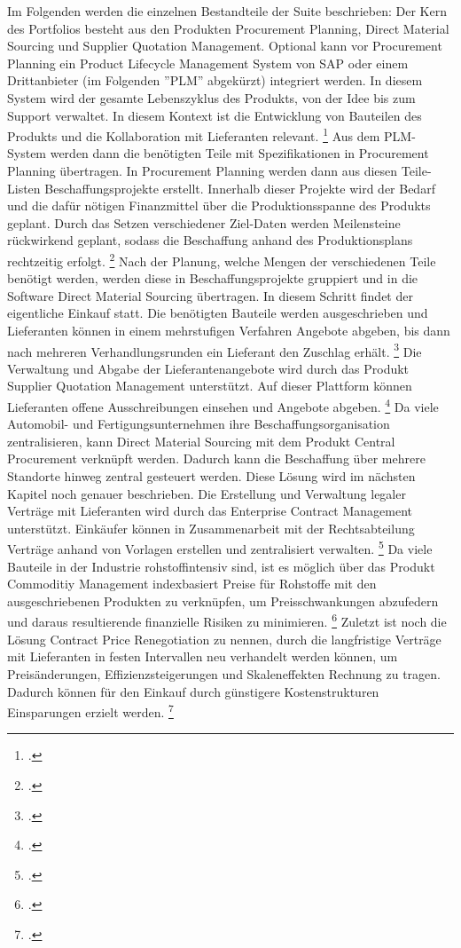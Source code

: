 Im Folgenden werden die einzelnen Bestandteile der Suite beschrieben: Der Kern des Portfolios besteht aus den Produkten Procurement Planning, Direct Material Sourcing und Supplier Quotation Management. Optional kann vor Procurement Planning ein Product Lifecycle Management System von SAP oder einem Drittanbieter (im Folgenden ''PLM'' abgekürzt) integriert werden. In diesem System wird der gesamte Lebenszyklus des Produkts, von der Idee bis zum Support verwaltet. In diesem Kontext ist die Entwicklung von Bauteilen des Produkts und die Kollaboration mit Lieferanten relevant. \footcite[Vgl.][]{theorie_sap_plm_übersicht_2024} Aus dem PLM-System werden dann die benötigten Teile mit Spezifikationen in Procurement Planning übertragen. In Procurement Planning werden dann aus diesen Teile-Listen Beschaffungsprojekte erstellt. Innerhalb dieser Projekte wird der Bedarf und die dafür nötigen Finanzmittel über die Produktionsspanne des Produkts geplant. Durch das Setzen verschiedener Ziel-Daten werden Meilensteine rückwirkend geplant, sodass die Beschaffung anhand des Produktionsplans rechtzeitig erfolgt. \footcite[Vgl.][]{theorie_sap_procurement_planning_overview_2024} Nach der Planung, welche Mengen der verschiedenen Teile benötigt werden, werden diese in Beschaffungsprojekte gruppiert und in die Software Direct Material Sourcing übertragen. In diesem Schritt findet der eigentliche Einkauf statt. Die benötigten Bauteile werden ausgeschrieben und Lieferanten können in einem mehrstufigen Verfahren Angebote abgeben, bis dann nach mehreren Verhandlungsrunden ein Lieferant den Zuschlag erhält. \footcite[Vgl.][]{theorie_sap_webseite_dms_übersicht_2024} Die Verwaltung und Abgabe der Lieferantenangebote wird durch das Produkt Supplier Quotation Management unterstützt. Auf dieser Plattform können Lieferanten offene Ausschreibungen einsehen und Angebote abgeben. \footcite[Vgl.][]{theorie_sap_supplier_quotation_management_help_2024} Da viele Automobil- und Fertigungsunternehmen ihre Beschaffungsorganisation zentralisieren, kann Direct Material Sourcing mit dem Produkt Central Procurement verknüpft werden. Dadurch kann die Beschaffung über mehrere Standorte hinweg zentral gesteuert werden. Diese Lösung wird im nächsten Kapitel noch genauer beschrieben. Die Erstellung und Verwaltung legaler Verträge mit Lieferanten wird durch das Enterprise Contract Management unterstützt. Einkäufer können in Zusammenarbeit mit der Rechtsabteilung Verträge anhand von Vorlagen erstellen und zentralisiert verwalten. \footcite[Vgl.][]{theorie_sap_enterprise_contract_management_2024} Da viele Bauteile in der Industrie rohstoffintensiv sind, ist es möglich über das Produkt Commoditiy Management indexbasiert Preise für Rohstoffe mit den ausgeschriebenen Produkten zu verknüpfen, um Preisschwankungen abzufedern und daraus resultierende finanzielle Risiken zu minimieren. \footcite[Vgl.][]{theorie_sap_commodity_management_2024} Zuletzt ist noch die Lösung Contract Price Renegotiation zu nennen, durch die langfristige Verträge mit Lieferanten in festen Intervallen neu verhandelt werden können, um Preisänderungen, Effizienzsteigerungen und Skaleneffekten Rechnung zu tragen. Dadurch können für den Einkauf durch günstigere Kostenstrukturen Einsparungen erzielt werden. \footcite[Vgl.][]{theorie_sap_contract_price_renegotiation_2024}

